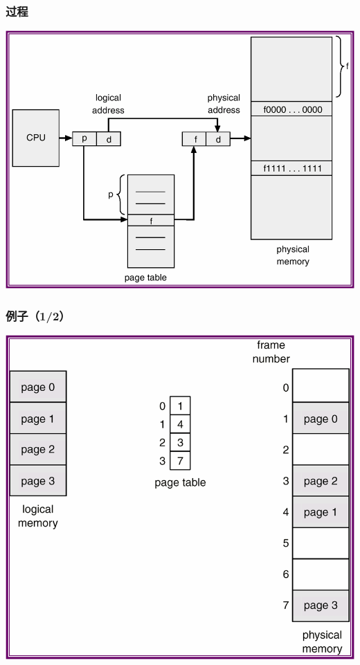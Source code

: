 \documentclass[CJKutf8,xcolor=pdftex,dvipsnames,table]{beamer}
\begin{document}
\begin{CJK*}{UTF8}{song}
  \begin{frame}
  \frametitle{过程} \pause
  \begin{center}
    \includegraphics[scale=.6]{v6f9-6}
  \end{center}
  \end{frame}
  
  \begin{frame}
  \frametitle{例子（1/2）} \pause
  \begin{center}
    \includegraphics[scale=.5]{v6f9-7}
  \end{center}
  \end{frame}
  

\end{CJK*}
\end{document}
